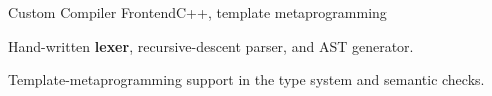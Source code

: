 \begin{cvproject}{Custom Compiler Frontend}{C++, template metaprogramming}
  \item Hand-written \textbf{lexer}, recursive-descent parser, and AST generator.
  \item Template-metaprogramming support in the type system and semantic checks.
\end{cvproject}
